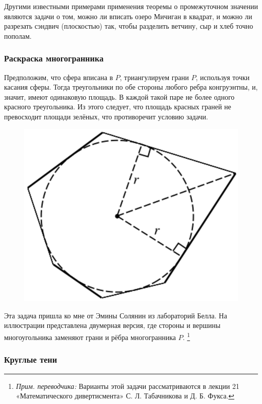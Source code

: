 Другими  известными примерами применения теоремы о промежуточном значении являются задачи о том, можно ли вписать озеро Мичиган в квадрат, и можно ли  разрезать сэндвич (плоскостью) так, чтобы разделить ветчину, сыр и хлеб точно пополам.

\subsubsection*{Раскраска многогранника}%

Предположим, что сфера вписана в $P$, триангулируем грани $P$, используя точки касания сферы.
Тогда треугольники по обе стороны любого ребра конгруэнтны, и, значит, имеют одинаковую площадь.
В каждой такой паре не более одного красного треугольника.
Из этого следует, что площадь красных граней не превосходит площади зелёных, что противоречит условию задачи.\heart

\begin{figure}[h!]
\centering
\includegraphics[scale=0.5]{Figs/Geometry/polygon}
\end{figure}

Эта задача пришла ко мне от Эмины Солянин %
из лабораторий Белла.
На иллюстрации представлена двумерная версия, где стороны и вершины многоугольника заменяют грани и рёбра многогранника $P$.%
\footnote{\emph{Прим. переводчика:} Варианты этой задачи рассматриваются в лекции 21 «Математического дивертисмента» С. Л. Табачникова и Д. Б. Фукса.}

\subsubsection*{Круглые тени}%

